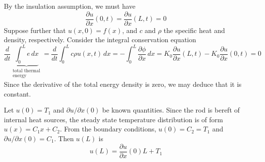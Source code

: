 \documentclass[a4paper]{article}
\begin{document}
By the insulation assumption, we must have
\[
	\frac{\partial u}{\partial x}\!\left( 0,t \right) = \frac{\partial u}{\partial x}\!\left( L,t \right) = 0 
\]
Suppose further that \( u \!\left( x,0 \right) = f \!\left( x \right) \), and \( c \) and \( \rho \) the specific heat and density, respectively. Consider the integral conservation equation
\[
	\frac{d }{d t}\underbrace{\int^{L}_{0} e \, dx}_{\substack{\text{total thermal} \\ \text{energy}}} = \frac{d }{d t}\int^{L}_{0} c \rho u \!\left( x,t \right) \, dx = -\int^{L}_{0} \frac{\partial \phi}{\partial x} \, dx = K_{0}\frac{\partial u}{\partial x}\!\left( L,t \right) - K_{0}\frac{\partial u}{\partial x}\!\left( 0,t \right) = 0
\]
Since the derivative of the total energy density is zero, we may deduce that it is constant.

\vspace{12pt}


Let \( u \!\left( 0 \right) = T_{1} \) and \( \partial u / \partial x \!\left( 0 \right) \) be known quantities. Since the rod is bereft of internal heat sources, the steady state temperature distribution is of form \( u \!\left( x \right) = C_{1}x + C_{2} \). From the boundary conditions, \( u \!\left( 0 \right) = C_{2} = T_{1} \) and \( \partial u / \partial x \!\left( 0 \right) = C_{1} \). Then \( u \!\left( L \right) \) is
\[
	u \!\left( L \right) = \frac{\partial u}{\partial x}\!\left( 0 \right)L + T_{1}
\]

\end{document}
